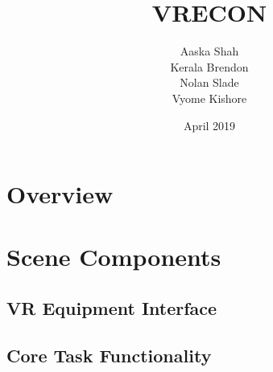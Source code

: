 \documentclass{article}
\title{VRECON}
\author{Aaska Shah\\Kerala Brendon\\Nolan Slade\\Vyome Kishore}
\date{April 2019}
\begin{document}
\maketitle
 
\newpage

\tableofcontents

\section{Overview}

\section{Scene Components}
\subsection{VR Equipment Interface} %



\subsection{Core Task Functionality} %
\end{document}
